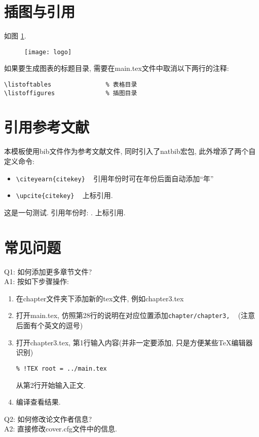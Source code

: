 \section{插图与引用}
如图 \ref{fig:logo}.
\begin{figure}[h]
	\centering
	\texttt{[image: logo]}
	\label{fig:logo}
\end{figure}

如果要生成图表的标题目录, 需要在main.tex文件中取消以下两行的注释:
\begin{verbatim}
\listoftables               % 表格目录
\listoffigures              % 插图目录
\end{verbatim}

\section{引用参考文献}
本模板使用bib文件作为参考文献文件, 同时引入了natbib宏包, 此外增添了两个自定义命令:
\begin{itemize}
\item \verb|\citeyearn{citekey}|  ~  引用年份时可在年份后面自动添加``年''
\item \verb|\upcite{citekey}| ~ 上标引用.
\end{itemize}

这是一句测试\cite{Hazay_2010_Efficient}. 引用年份时: . 上标引用.

\section{常见问题}
Q1: 如何添加更多章节文件?\\
A1: 按如下步骤操作:
\begin{enumerate}
\item 在chapter文件夹下添加新的tex文件, 例如chapter3.tex
\item 打开main.tex, 仿照第28行的说明在对应位置添加\verb|chapter/chapter3,| ~ (注意后面有个英文的逗号)
\item 打开chapter3.tex, 第1行输入内容(并非一定要添加, 只是方便某些TeX编辑器识别)
\begin{verbatim}
% !TEX root = ../main.tex
\end{verbatim}
从第2行开始输入正文.
\item 编译查看结果.
\end{enumerate}

Q2: 如何修改论文作者信息?\\
A2: 直接修改cover.cfg文件中的信息.\\

